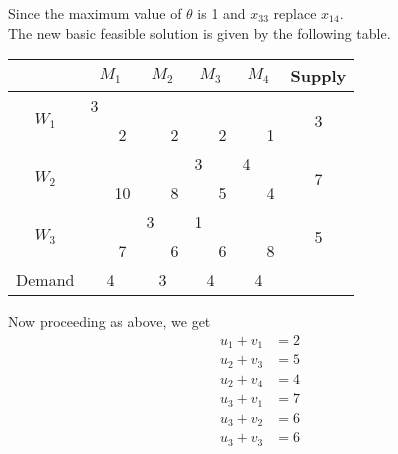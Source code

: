 \documentclass[../main-sheet.tex]{subfiles}
\begin{document}
        Since the maximum value of \(\theta\) is 1 and \(x_{33}\) replace \(x_{14}\).\\
        The new basic feasible solution is given by the following table.
        \begin{table}[H]
            \centering
            \begin{tabular}{|c|cc|cc|cc|cc|c|}
            \hline
                                   & \multicolumn{2}{c|}{$M_1$} & \multicolumn{2}{c|}{$M_2$} & \multicolumn{2}{c|}{$M_3$} & \multicolumn{2}{c|}{$M_4$} & Supply             \\ \hline
            \multirow{2}{*}{$W_1$} & 3                     &    &                        &   &                        &   &                        &   & \multirow{2}{*}{3} \\ \cline{3-3} \cline{5-5} \cline{7-7} \cline{9-9}
                                   & \multicolumn{1}{c|}{} & 2  & \multicolumn{1}{c|}{}  & 2 & \multicolumn{1}{c|}{}  & 2 & \multicolumn{1}{c|}{}  & 1 &                    \\ \hline
            \multirow{2}{*}{$W_2$} &                       &    &                        &   & 3                      &   & 4                      &   & \multirow{2}{*}{7} \\ \cline{3-3} \cline{5-5} \cline{7-7} \cline{9-9}
                                   & \multicolumn{1}{c|}{} & 10 & \multicolumn{1}{c|}{}  & 8 & \multicolumn{1}{c|}{}  & 5 & \multicolumn{1}{c|}{}  & 4 &                    \\ \hline
            \multirow{2}{*}{$W_3$} &                       &    & 3                      &   & 1                      &   &                        &   & \multirow{2}{*}{5} \\ \cline{3-3} \cline{5-5} \cline{7-7} \cline{9-9}
                                   & \multicolumn{1}{c|}{} & 7  & \multicolumn{1}{c|}{}  & 6 & \multicolumn{1}{c|}{}  & 6 & \multicolumn{1}{c|}{}  & 8 &                    \\ \hline
            Demand                 & \multicolumn{2}{c|}{4}     & \multicolumn{2}{c|}{3}     & \multicolumn{2}{c|}{4}     & \multicolumn{2}{c|}{4}     &                    \\ \hline
            \end{tabular}
            \end{table}
Now proceeding as above, we get 
\begin{align*}
                u_1+v_1&=2\\
                u_2+v_3&=5\\
                u_2+v_4&=4\\
                u_3+v_1&=7\\
                u_3+v_2&=6\\
                u_3+v_3&=6
            \end{align*}
\end{document}
